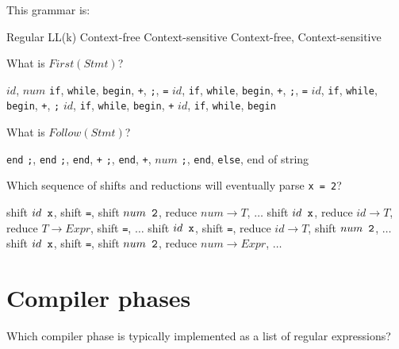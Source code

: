 \documentclass[addpoints,answers]{exam}
\begin{document}
\begin{questions}
\question This grammar is:

\begin{oneparchoices}
\choice Regular
\choice LL(k)
\choice Context-free
\choice Context-sensitive
\choice Context-free, Context-sensitive
\end{oneparchoices}

\answerline[E]

\question What is $First(Stmt)$?

\begin{choices}
\choice $id$, $num$ \verb+if+, \verb+while+, \verb+begin+, \verb|+|, \verb+;+, \verb+=+
\choice $id$, \verb+if+, \verb+while+, \verb+begin+, \verb|+|, \verb+;+, \verb+=+
\choice $id$, \verb+if+, \verb+while+, \verb+begin+, \verb|+|, \verb+;+
\choice $id$, \verb+if+, \verb+while+, \verb+begin+, \verb|+|
\choice $id$, \verb+if+, \verb+while+, \verb+begin+
\end{choices}

\answerline[E]

\question What is $Follow(Stmt)$?

\begin{choices}
\choice \verb+end+
\choice \verb+;+, \verb+end+
\choice \verb+;+, \verb+end+, \verb|+|
\choice \verb+;+, \verb+end+, \verb|+|, $num$
\choice \verb+;+, \verb+end+, \verb+else+, end of string
\end{choices}

\answerline[E]

\question Which sequence of shifts and reductions will eventually parse \verb+x = 2+?

\begin{choices}
\choice shift $id \verb+ x+$, shift \verb+=+, shift $num \verb+ 2+$, reduce $num \to T$, $\ldots$
\choice shift $id \verb+ x+$, reduce $id \to T$, reduce $T \to Expr$, shift \verb+=+, $\ldots$
\choice shift $id \verb+ x+$, shift \verb+=+, reduce $id \to T$, shift $num \verb+ 2+$, $\ldots$
\choice shift $id \verb+ x+$, shift \verb+=+, shift $num \verb+ 2+$, reduce $num \to Expr$, $\ldots$
\end{choices}

\answerline[A]
\pagebreak

\section{Compiler phases}

\question Which compiler phase is typically implemented as a list of regular expressions?


\end{questions}
\end{document}
